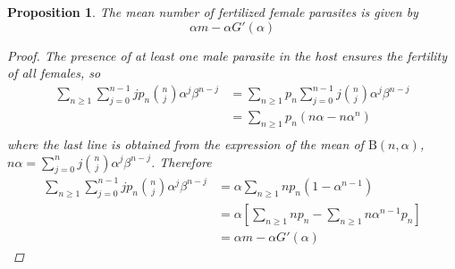 \documentclass[12pt,a4paper]{article}
\theoremstyle{plain}%
\newtheorem{prop}[thm]{Proposition}
\theoremstyle{definition}
\theoremstyle{remark}
\begin{document}
	\begin{prop}\label{hembrasfecun}
		The mean number of fertilized female parasites is given by     
		\begin{equation}
		\alpha  m - \alpha G'(\alpha)
		\end{equation}
		\begin{proof}
			The presence of at least one male parasite in the host ensures the fertility of all females, so
			\begin{equation*}
			\begin{split}
			\sum_{n\geq 1}\sum_{j=0}^{n-1}j p_n\binom{n}{j}\alpha^j\beta^{n-j}
			&=\sum_{n\geq 1}p_n\sum_{j=0}^{n-1} j\binom{n}{j}\alpha^j\beta^{n-j}\\
			&=\sum_{n\geq 1}p_n(n\alpha-n\alpha^n)\\
			\end{split}
			\end{equation*}
			where the last line is obtained from the expression of the mean of $\mathrm{B}(n,\alpha)$, $n\alpha=\sum_{j=0}^{n} j\binom{n} {j}\alpha^j\beta^{n-j}$. Therefore
			\begin{equation*}
			\begin{split}
			\sum_{n\geq 1}\sum_{j=0}^{n-1}jp_n\binom{n}{j}\alpha^j\beta^{n-j}
			&=\alpha\sum_{n\geq 1}np_n(1-\alpha^{n-1})\\
			&=\alpha \left[ \sum_{n\geq 1}np_n-\sum_{n\geq 1}n\alpha ^{n-1}p_n\right] \\
			&= \alpha  m - \alpha G'(\alpha) 
			\end{split}
			\end{equation*}
		\end{proof}
	\end{prop}
	
	
\end{document}

